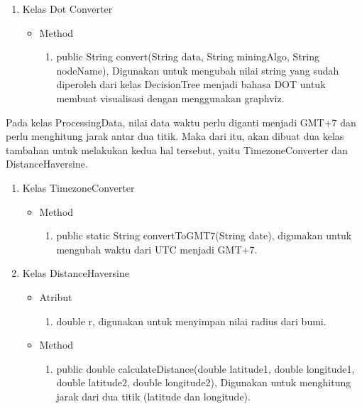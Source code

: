 \begin{enumerate}
	\item Kelas Dot Converter
	\begin{itemize}
		\item Method
		\begin{enumerate}
			\item public String convert(String data, String miningAlgo, String nodeName), Digunakan untuk mengubah nilai string yang sudah diperoleh dari kelas DecisionTree menjadi bahasa DOT untuk membuat visualisasi dengan menggunakan graphviz.
		\end{enumerate}
	\end{itemize}
\end{enumerate}
	
	Pada kelas ProcessingData, nilai data waktu perlu diganti menjadi GMT+7 dan perlu menghitung jarak antar dua titik. Maka dari itu, akan dibuat dua kelas tambahan untuk melakukan kedua hal tersebut, yaitu TimezoneConverter dan DistanceHaversine.
	
\begin{enumerate}
	\item Kelas TimezoneConverter
	\begin{itemize}
		\item Method
		\begin{enumerate}
			\item public static String convertToGMT7(String date), digunakan untuk mengubah waktu dari UTC menjadi GMT+7.
		\end{enumerate}
	\end{itemize}

	\item Kelas DistanceHaversine
	\begin{itemize}
		\item Atribut
		\begin{enumerate}
			\item double r, digunakan untuk menyimpan nilai radius dari bumi.
		\end{enumerate}
		\item Method
		\begin{enumerate}
			\item public double calculateDistance(double latitude1, double longitude1, double latitude2, double longitude2), Digunakan untuk menghitung jarak dari dua titik (latitude dan longitude).
		\end{enumerate}
	\end{itemize}
\end{enumerate}

